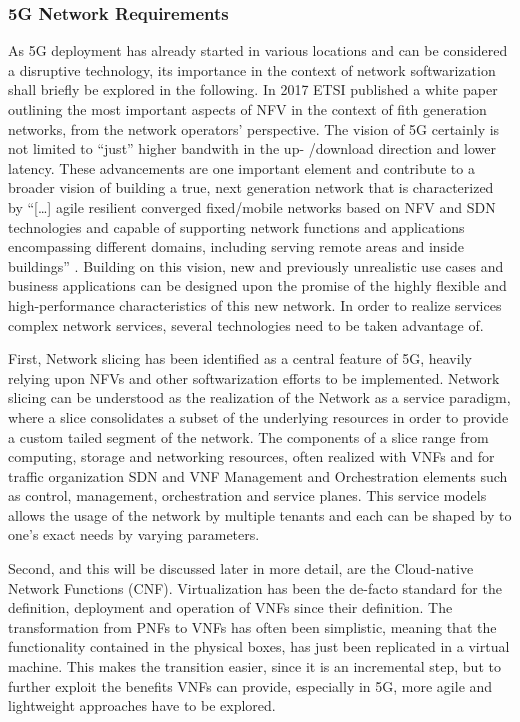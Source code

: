 \subsubsection{5G Network Requirements}
As 5G deployment has already started in various locations and can be considered a disruptive technology, its importance in the context of network softwarization shall briefly be explored in the following. In 2017 ETSI published a white paper outlining the most important aspects of NFV in the context of fith generation networks, from the network operators' perspective. The vision of 5G certainly is not limited to ``just'' higher bandwith in the up- /download  direction and lower latency. These advancements are one important element and contribute to a broader vision of  building a true, next generation network that is characterized by ``[\dots] agile resilient converged fixed/mobile networks based on NFV and SDN technologies and capable of supporting network functions and applications encompassing different domains, including serving remote areas and inside buildings'' \cite{nfv5g}. Building on this vision, new and previously unrealistic use cases and business applications can be designed upon the promise of the highly flexible and high-performance characteristics of this new network. In order to realize services complex network services, several technologies need to be taken advantage of. 

First, Network slicing has been identified as a central feature of 5G, heavily relying upon NFVs and other softwarization efforts to be implemented. Network slicing can be understood as the realization of the Network as a service paradigm, where a slice consolidates a subset of the underlying resources in order to provide a custom tailed segment of the network. The components of a slice range from computing, storage and networking resources, often realized with VNFs and for traffic organization SDN and VNF Management and Orchestration elements such as control, management, orchestration and service planes. This service models allows the usage of the network by multiple tenants and each can be shaped by to one's exact needs by varying parameters.
 
Second, and this will be discussed later in more detail, are the Cloud-native Network Functions (CNF).  Virtualization has been the de-facto standard for the definition, deployment and operation of VNFs since their definition. The transformation from PNFs to VNFs has often been simplistic, meaning that the functionality contained in the physical boxes, has just been replicated in a virtual machine. This makes the transition easier, since it is an incremental step, but to further exploit the benefits VNFs can provide, especially in 5G, more agile and lightweight approaches have to be explored. 

